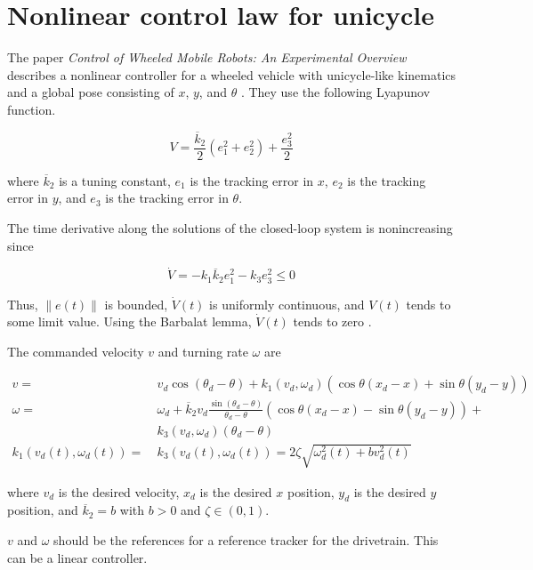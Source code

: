 \section{Nonlinear control law for unicycle}

The paper \textit{Control of Wheeled Mobile Robots: An Experimental Overview}
describes a nonlinear controller for a wheeled vehicle with unicycle-like
kinematics and a global \gls{pose} consisting of $x$, $y$, and $\theta$
\cite{bib:ctrl-wheeled-mobile-robots}. They use the following Lyapunov function.

\begin{equation*}
  V = \frac{\overline{k}_2}{2}(e_1^2 + e_2^2) + \frac{e_3^2}{2}
\end{equation*}

where $\overline{k}_2$ is a tuning constant, $e_1$ is the tracking error in $x$,
$e_2$ is the tracking error in $y$, and $e_3$ is the tracking error in $\theta$.

The time derivative along the solutions of the closed-loop \gls{system} is
nonincreasing since

\begin{equation*}
  \dot{V} = -k_1 \overline{k}_2 e_1^2 - k_3 e_3^2 \leq 0
\end{equation*}

Thus, $\lVert e(t) \rVert$ is bounded, $\dot{V}(t)$ is uniformly continuous,
and $V(t)$ tends to some limit value. Using the Barbalat lemma, $\dot{V}(t)$
tends to zero \cite{bib:ctrl-wheeled-mobile-robots}.

The commanded velocity $v$ and turning rate $\omega$ are

\begin{align}
  v =~& v_d \cos(\theta_d - \theta) + k_1(v_d, \omega_d)(\cos\theta(x_d - x) +
    \sin\theta(y_d - y)) \\
  \omega =~& \omega_d +
    \overline{k}_2 v_d\frac{\sin(\theta_d - \theta)}{\theta_d - \theta}
    (\cos\theta(x_d - x) - \sin\theta(y_d - y)) + \nonumber \\
    &k_3 (v_d, \omega_d)(\theta_d - \theta) \\
  k_1(v_d(t), \omega_d(t)) =~& k_3(v_d(t), \omega_d(t)) =
    2\zeta\sqrt{\omega_d^2(t) + bv_d^2(t)}
\end{align}

where $v_d$ is the desired velocity, $x_d$ is the desired $x$ position, $y_d$ is
the desired $y$ position, and $\overline{k}_2 = b$ with $b > 0$ and
$\zeta \in (0, 1)$.

$v$ and $\omega$ should be the \glspl{reference} for a \gls{reference} tracker
for the drivetrain. This can be a linear controller.

